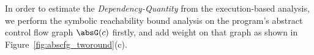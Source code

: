 
In order to estimate the \emph{Dependency-Quantity} from the execution-based analysis,
we perform the symbolic reachability bound analysis on the program's abstract control flow graph $\absG(c)$ firstly,
and add weight on that graph as shown in Figure~\ref{fig:abscfg_tworound}(c). 
% 
